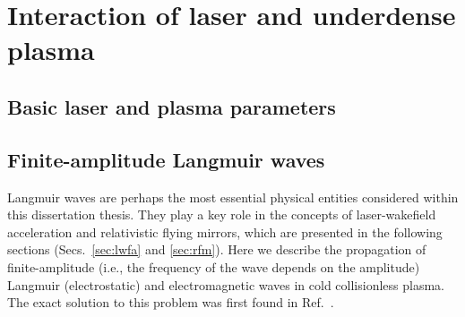 \documentclass[10pt, a4paper, twoside, openright]{report}
\begin{document}
\section{Interaction of laser and underdense plasma}
%

%

%

%

%

\subsection{Basic laser and plasma parameters}

\subsection{Finite-amplitude Langmuir waves}
%

Langmuir waves are perhaps the most essential physical entities considered within this dissertation thesis. They play a key role in the concepts of laser-wakefield acceleration and relativistic flying mirrors, which are presented in the following sections (Secs.~\ref{sec:lwfa} and \ref{sec:rfm}). Here we describe the propagation of finite-amplitude (i.e., the frequency of the wave depends on the amplitude) Langmuir (electrostatic) and electromagnetic waves in cold collisionless plasma. The exact solution to this problem was first found in Ref.~.
\end{document}
